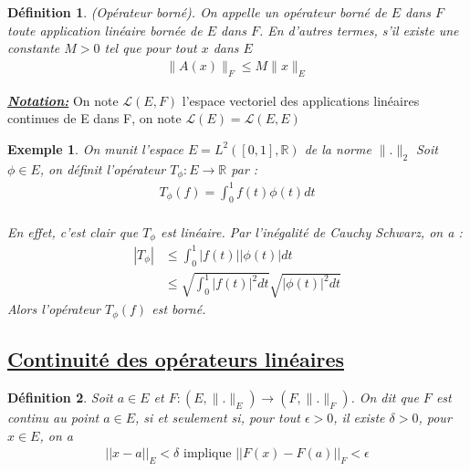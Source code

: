 \documentclass{report}
\newtheorem{Def}{Définition}[subsection]
\newtheorem{Ex}{Exemple}[subsection]
\begin{document}
{%

\begin{Def}
(Opérateur borné). On appelle un opérateur  borné de $E$ dans $F$ toute application linéaire bornée de $E$ dans $F$. En d'autres termes, s'il existe une constante $M > 0$ tel que pour tout $x$ dans $E$ 
			\begin{align*}\lVert A(x) \rVert_{F} \leq M \lVert x \rVert_{E}\end{align*}
\end{Def}


\textbf{\underline{\textit{Notation:}}} On note $\mathscr{L}(E, F)$ l'espace vectoriel des applications linéaires continues de E dans F, on note $\mathscr{L}(E) = \mathscr{L}(E, E)$\\



\begin{Ex}
On munit l'espace $E = L^{2}([0,1], \mathbb{R})$ de la norme $\lVert . \rVert_{2}$ Soit $\phi \in E$, on définit l'opérateur $T_{\phi} : E \rightarrow \mathbb{R}$ par : 
			\begin{align*}T_{\phi}(f) = \int_{0}^{1} f(t)\phi(t) dt\end{align*}	
	\\
En effet, c'est clair que $T_{\phi}$ est linéaire. Par l'inégalité de Cauchy Schwarz, on a :	
			\begin{align*}
				|T_{\phi}| &\leq \int_{0}^{1} |f(t)| |\phi(t)| dt	\\
					      &\leq \sqrt{\int_{0}^{1} |f(t)|^{2} dt}	 \sqrt{|\phi(t)|^{2} dt}
			\end{align*}
Alors l'opérateur $T_{\phi}(f)$ est  borné.
\end{Ex}



\subsection{\underline{ Continuité des opérateurs linéaires}}




\begin{Def}
Soit $a \in E$ et $F: (E, \lVert . \rVert_{E})  \rightarrow (F, \lVert . \rVert_{F})$. On dit que $F$ est continu au point $a \in E$, si et seulement si, pour tout $\epsilon > 0$, il existe $\delta > 0$, pour $x \in E$, on a 
			\begin{align*}
			|| x - a ||_{E} < \delta \,\,\text{implique}\,\, || F(x) - F(a)||_{F} < \epsilon
			\end{align*}
\end{Def}




}
\end{document}

